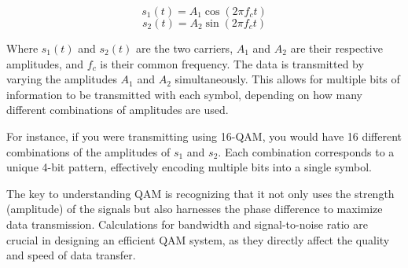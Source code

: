 \[
s_1(t) = A_1 \cos(2 \pi f_c t)
\]
\[
s_2(t) = A_2 \sin(2 \pi f_c t)
\]

Where \(s_1(t)\) and \(s_2(t)\) are the two carriers, \(A_1\) and \(A_2\) are their respective amplitudes, and \(f_c\) is their common frequency. The data is transmitted by varying the amplitudes \(A_1\) and \(A_2\) simultaneously. This allows for multiple bits of information to be transmitted with each symbol, depending on how many different combinations of amplitudes are used.

For instance, if you were transmitting using 16-QAM, you would have 16 different combinations of the amplitudes of \(s_1\) and \(s_2\). Each combination corresponds to a unique 4-bit pattern, effectively encoding multiple bits into a single symbol. 

The key to understanding QAM is recognizing that it not only uses the strength (amplitude) of the signals but also harnesses the phase difference to maximize data transmission. Calculations for bandwidth and signal-to-noise ratio are crucial in designing an efficient QAM system, as they directly affect the quality and speed of data transfer.

